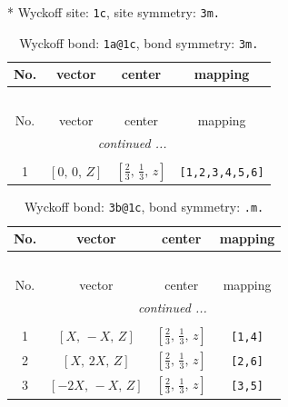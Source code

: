 \documentclass[fleqn,8pt]{jsarticle}
\begin{document}
* Wyckoff site: {\tt 1c}, site symmetry: {\tt 3m.}
\renewcommand{\arraystretch}{1.2}
\begin{longtable}{cccc}
\caption{Wyckoff bond: {\tt 1a@1c}, bond symmetry: {\tt 3m.}}
 \\
 \hline \hline
No. & vector & center & mapping \\ \hline \endfirsthead

\multicolumn{3}{l}{\tablename\ \thetable{}} \\
 \hline \hline
No. & vector & center & mapping \\ \hline \endhead

 \hline \hline
\multicolumn{3}{r}{\footnotesize\it continued ...} \\ \endfoot

 \hline \hline
\multicolumn{3}{r}{} \\ \endlastfoot

1 & $\left[ 0,\, 0,\, Z \right]$ & $\left[ \frac{2}{3},\, \frac{1}{3},\, z \right]$ & {\tt [1,2,3,4,5,6]} \\
\end{longtable}
\renewcommand{\arraystretch}{1.2}
\begin{longtable}{cccc}
\caption{Wyckoff bond: {\tt 3b@1c}, bond symmetry: {\tt .m.}}
 \\
 \hline \hline
No. & vector & center & mapping \\ \hline \endfirsthead

\multicolumn{3}{l}{\tablename\ \thetable{}} \\
 \hline \hline
No. & vector & center & mapping \\ \hline \endhead

 \hline \hline
\multicolumn{3}{r}{\footnotesize\it continued ...} \\ \endfoot

 \hline \hline
\multicolumn{3}{r}{} \\ \endlastfoot

1 & $\left[ X,\, - X,\, Z \right]$ & $\left[ \frac{2}{3},\, \frac{1}{3},\, z \right]$ & {\tt [1,4]} \\ \hline
2 & $\left[ X,\, 2 X,\, Z \right]$ & $\left[ \frac{2}{3},\, \frac{1}{3},\, z \right]$ & {\tt [2,6]} \\ \hline
3 & $\left[ - 2 X,\, - X,\, Z \right]$ & $\left[ \frac{2}{3},\, \frac{1}{3},\, z \right]$ & {\tt [3,5]} \\
\end{longtable}
\renewcommand{\arraystretch}{1.2}
\end{document}
